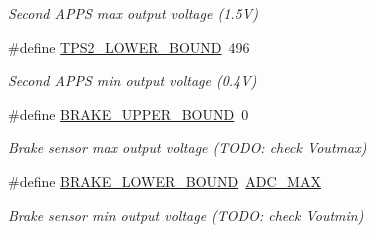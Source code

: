 \begin{DoxyCompactItemize}
\begin{DoxyCompactList}\small\item\em Second A\+P\+PS max output voltage (1.\+5V) \end{DoxyCompactList}\item 
\mbox{\label{group___board__model__group_gadfcc723e175ac44e73e38407299ac875}} 
\#define \mbox{\hyperlink{group___board__model__group_gadfcc723e175ac44e73e38407299ac875}{T\+P\+S2\+\_\+\+L\+O\+W\+E\+R\+\_\+\+B\+O\+U\+ND}}~496
\begin{DoxyCompactList}\small\item\em Second A\+P\+PS min output voltage (0.\+4V) \end{DoxyCompactList}\item 
\mbox{\label{group___board__model__group_ga891de03ab9e1bd9a92ffffe69a1b10ca}} 
\#define \mbox{\hyperlink{group___board__model__group_ga891de03ab9e1bd9a92ffffe69a1b10ca}{B\+R\+A\+K\+E\+\_\+\+U\+P\+P\+E\+R\+\_\+\+B\+O\+U\+ND}}~0
\begin{DoxyCompactList}\small\item\em Brake sensor max output voltage (T\+O\+DO\+: check Voutmax) \end{DoxyCompactList}\item 
\mbox{\label{group___board__model__group_ga0aed20cafcc206360abda47b125432c7}} 
\#define \mbox{\hyperlink{group___board__model__group_ga0aed20cafcc206360abda47b125432c7}{B\+R\+A\+K\+E\+\_\+\+L\+O\+W\+E\+R\+\_\+\+B\+O\+U\+ND}}~\mbox{\hyperlink{group___board__model__group_ga555a695bf58df062dc03f0e892d95cd7}{A\+D\+C\+\_\+\+M\+AX}}
\begin{DoxyCompactList}\small\item\em Brake sensor min output voltage (T\+O\+DO\+: check Voutmin) \end{DoxyCompactList}\end{DoxyCompactItemize}
